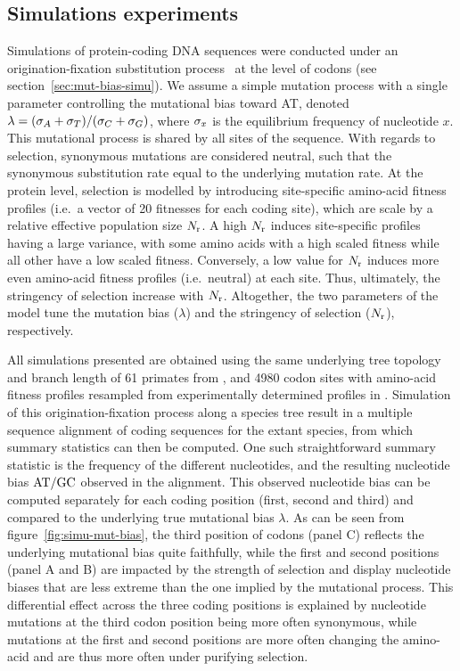\documentclass{article}
\begin{document}
\subsection{Simulations experiments}
\label{subsec:simulations-experiments}

Simulations of protein-coding {DNA} sequences were conducted under an origination-fixation {substitution} process~\citep{McCandlish2014} at the level of codons (see section~\ref{sec:mut-bias-simu}).
We assume a simple mutation process with a single parameter controlling the mutational bias toward AT, denoted $\lambda = (\sigma_A+\sigma_T)/(\sigma_C+\sigma_G)$, where $\sigma_x$ is the equilibrium frequency of nucleotide $x$.
This mutational process is shared by all sites of the sequence.
With regards to selection, {synonymous} mutations are considered {neutral}, such that the {synonymous} {substitution} rate equal to the underlying mutation rate.
At the protein level, selection is modelled by introducing site-specific amino-acid fitness profiles (i.e.~a vector of 20 fitnesses for each coding site), which are scale by a relative effective population size $N_{\text{r}}$.
A high $N_{\text{r}}$ induces site-specific profiles having a large variance, with some amino acids with a high scaled fitness while all other have a low scaled fitness.
Conversely, a low value for $N_{\text{r}}$ induces more even amino-acid fitness profiles (i.e.~neutral) at each site.
Thus, ultimately, the stringency of selection increase with $N_{\text{r}}$.
Altogether, the two parameters of the model tune the mutation bias ($\lambda$) and the stringency of selection ($N_{\text{r}}$), respectively.

All simulations presented are obtained using the same underlying tree topology and branch length of 61 primates from \citet{Perelman2011}, and 4980 codon sites with amino-acid fitness profiles resampled from experimentally determined profiles in \citet{Bloom2017}.
Simulation of this origination-fixation process along a species tree result in a multiple sequence alignment of coding sequences for the extant species, from which summary statistics can then be computed.
One such straightforward summary statistic is the frequency of the different nucleotides, and the resulting nucleotide bias $\text{AT/GC}$ observed in the alignment.
This observed nucleotide bias can be computed separately for each coding position (first, second and third) and compared to the underlying true mutational bias $\lambda$.
As can be seen from figure~\ref{fig:simu-mut-bias}, the third position of codons (panel C) reflects the underlying mutational bias quite faithfully, while the first and second positions (panel A and B) are impacted by the strength of selection and display nucleotide biases that are less extreme than the one implied by the mutational process.
This differential effect across the three coding positions is explained by nucleotide mutations at the third codon position being more often {synonymous}, while mutations at the first and second positions are more often changing the amino-acid and are thus more often under purifying selection.
\end{document}
